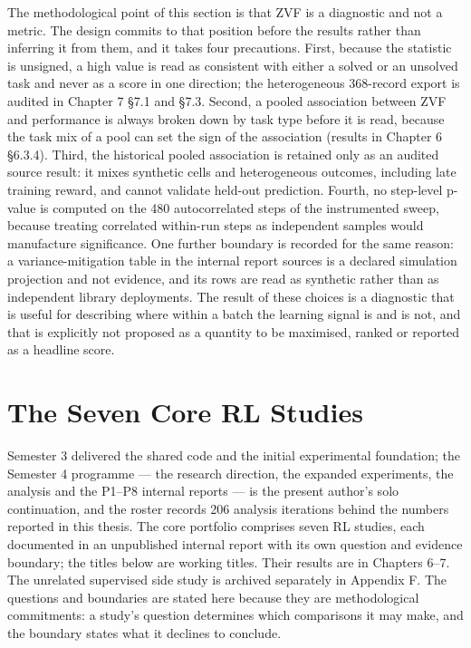 \documentclass[12pt,a4paper]{report}
\begin{document}
The methodological point of this section is that ZVF is a diagnostic and
not a metric. The design commits to that position before the results
rather than inferring it from them, and it takes four precautions.
First, because the statistic is unsigned, a high value is read as
consistent with either a solved or an unsolved task and never as a score
in one direction; the heterogeneous 368-record export is audited in
Chapter 7 §7.1 and §7.3. Second, a pooled association between ZVF and
performance is always broken down by task type before it is read,
because the task mix of a pool can set the sign of the association
(results in Chapter 6 §6.3.4). Third, the historical pooled association
is retained only as an audited source result: it mixes synthetic cells
and heterogeneous outcomes, including late training reward, and cannot
validate held-out prediction. Fourth, no step-level p-value is computed
on the 480 autocorrelated steps of the instrumented sweep, because
treating correlated within-run steps as independent samples would
manufacture significance. One further boundary is recorded for the same
reason: a variance-mitigation table in the internal report sources is a
declared simulation projection and not evidence, and its rows are read
as synthetic rather than as independent library deployments. The result
of these choices is a diagnostic that is useful for describing where
within a batch the learning signal is and is not, and that is explicitly
not proposed as a quantity to be maximised, ranked or reported as a
headline score.

\section{The Seven Core RL Studies}\label{the-seven-core-rl-studies}

Semester 3 delivered the shared code and the initial experimental
foundation; the Semester 4 programme --- the research direction, the
expanded experiments, the analysis and the P1--P8 internal reports ---
is the present author's solo continuation, and the roster records 206
analysis iterations behind the numbers reported in this thesis. The core
portfolio comprises seven RL studies, each documented in an unpublished
internal report with its own question and evidence boundary; the titles
below are working titles. Their results are in Chapters 6--7. The
unrelated supervised side study is archived separately in Appendix F.
The questions and boundaries are stated here because they are
methodological commitments: a study's question determines which
comparisons it may make, and the boundary states what it declines to
conclude.
\end{document}
